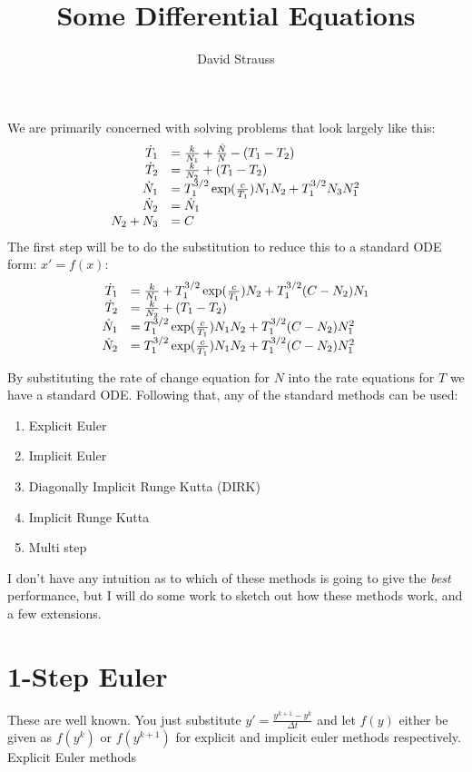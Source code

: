 \documentclass{article}
\title{Some Differential Equations}
\author{David Strauss}
\begin{document}
\maketitle
We are primarily concerned with solving problems that look largely like this:
\begin{equation}
\begin{array}{r l}
\dot{T}_1 & = \frac{k}{N_1} + \frac{\dot{N}}{N} - (T_1 - T_2)\\
\dot{T}_2 & = \frac{k}{N_2} + (T_1 - T_2)\\
\dot{N}_1 &= T_1^{3/2}\exp(\frac{c}{T_1}) N_1 N_2 +
T^{3/2}_1N_3N_1^2\\
\dot{N}_2 &= \dot{N}_1\\
N_2 + N_3 &= C
\end{array}
\end{equation}
The first step will be to do the substitution to reduce this to a standard ODE form: $x' = f(x)$:
\begin{equation}
\begin{array}{r l}
\dot{T}_1 &= \frac{k}{N_1} + T_1^{3/2}\exp(\frac{c}{T_1})N_2 +T_1^{3/2}(C-N_2)N_1\\
\dot{T}_2 &= \frac{k}{N_2} + (T_1-T_2) \\
\dot{N}_1 &=  T_1^{3/2}\exp(\frac{c}{T_1}) N_1 N_2 +
T^{3/2}_1(C-N_2)N_1^2\\
\dot{N}_2 &=  T_1^{3/2}\exp(\frac{c}{T_1}) N_1 N_2 +
T^{3/2}_1(C-N_2)N_1^2\\
\end{array}
\end{equation}

By substituting the rate of change equation for $N$ into the rate equations for $T$ we have a standard ODE. Following that, any of the standard methods can be used:
\begin{enumerate}
\item Explicit Euler
\item Implicit Euler
\item Diagonally Implicit Runge Kutta (DIRK)
\item Implicit Runge Kutta 
\item Multi step
\end{enumerate}

I don't have any intuition as to which of these methods is going to give the \emph{best} performance, but I will do some work to sketch out how these methods work, and a few extensions.

\section{1-Step Euler}
These are well known. You just substitute $y' = \frac{y^{k+1} - y^k}{\Delta t}$ and let $f(y)$ either be given as $f(y^k)$ or $f(y^{k+1})$ for explicit and implicit euler methods respectively. Explicit Euler methods 
\end{document}
